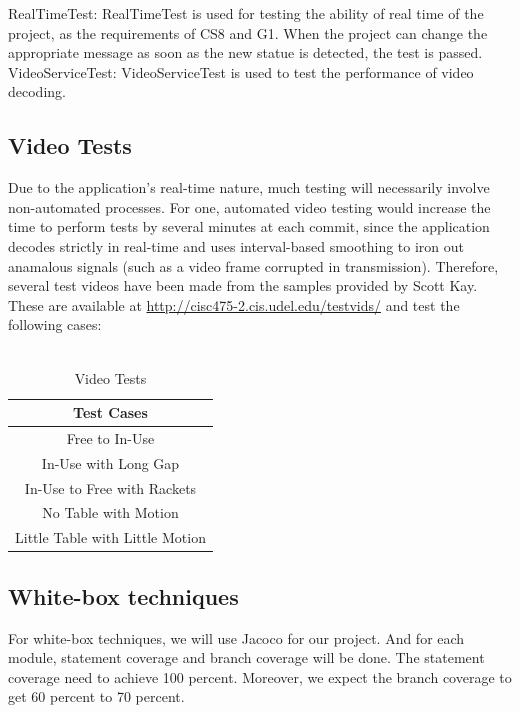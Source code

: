 \documentclass[11pt]{report}
\begin{document}
RealTimeTest: RealTimeTest is used for testing the ability of real time of the project, as the requirements of CS8 and G1. When the project can change the appropriate message as soon as the new statue is detected, the test is passed.\\

VideoServiceTest: VideoServiceTest is used to test the performance of video decoding.

\subsection{Video Tests}

Due to the application's real-time nature, much testing will necessarily involve non-automated processes.  For one, automated video testing would increase the time to perform tests by several minutes at each commit, since the application decodes strictly in real-time and uses interval-based smoothing to iron out anamalous signals (such as a video frame corrupted in transmission).  Therefore, several test videos have been made from the samples provided by Scott Kay.  These are available at \url{http://cisc475-2.cis.udel.edu/testvids/} and test the following cases:\\
\\
\begin{table}[htbp]
\begin{center}
\begin{tabular}{|c|}\hline
\textbf{Test Cases}\\\hline
Free to In-Use\\\hline
In-Use with Long Gap\\\hline
In-Use to Free with Rackets\\\hline
No Table with Motion\\\hline
Little Table with Little Motion\\\hline
\end{tabular}
\caption{Video Tests}
\end{center}
\end{table}

\subsection{White-box techniques}
For white-box techniques, we will use Jacoco for our project. And for each module, statement coverage and branch coverage will be done. The statement coverage need to achieve 100 percent. 
Moreover, we expect the branch coverage to get 60 percent to 70 percent.
\end{document}
